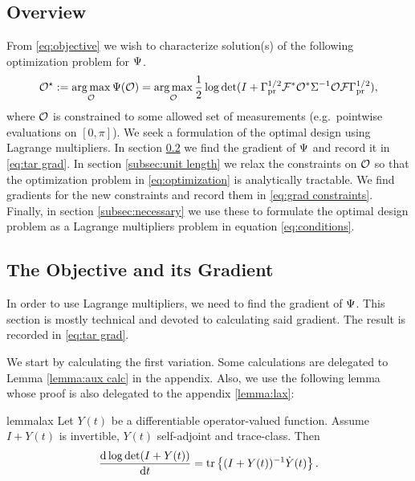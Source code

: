 \documentclass{amsart}
\numberwithin{equation}{section}
\begin{document}
\subsection{Overview}
From \eqref{eq:objective} we wish to characterize solution(s) of the
following optimization problem for $\Psi$. %
\begin{align}\label{eq:optimization}
  \mathcal{O}^{\star} := \operatorname*{arg\,max}_{\mathcal{O}} \Psi( \mathcal{O} ) 
  = \operatorname*{arg\,max}_{\mathcal{O}} \frac12 \log \det 
  (I + \Gamma_{\textup{pr}}^{1/2} \mathcal{F}^*\mathcal{O}^* \Sigma^{-1} \mathcal{O} \mathcal{F} \Gamma_{\textup{pr}}^{1/2}),
\end{align}
where $\mathcal{O}$ is constrained to some allowed set of measurements
(e.g.\ pointwise evaluations on $[0,\pi]$).
We seek a formulation of the optimal design using Lagrange
multipliers. In section \ref{section:objective} we find the gradient
of $\Psi$ and record it in \eqref{eq:tar grad}. In section
\ref{subsec:unit length} we relax the constraints on $\mathcal{O}$ so that
the optimization problem in \eqref{eq:optimization} is analytically
tractable.  We find gradients for the new constraints and record them
in \eqref{eq:grad constraints}. Finally, in section
\ref{subsec:necessary} we use these to formulate the optimal design
problem as a Lagrange multipliers problem in equation
\eqref{eq:conditions}.


\subsection{The Objective and its Gradient}\label{section:objective}
In order to use Lagrange multipliers, we need to find the gradient of
$\Psi$. This section is mostly technical and devoted to calculating
said gradient. The result is recorded in \eqref{eq:tar grad}.

We start by calculating the first variation. Some calculations are
delegated to Lemma \ref{lemma:aux calc} in the appendix. Also, we use
the following lemma whose proof is also delegated to the appendix
\ref{lemma:lax}:
\begin{restatable*}{lemma}{lax}\label{lemma:lax}
  Let $Y(t)$ be a differentiable operator-valued function. Assume 
  $I+Y(t)$ is invertible, $Y(t)$ self-adjoint and trace-class. Then
  \begin{equation*}
    \frac{\text{\textup{d}} \log \det (I+Y(t))}{\text{\textup{d}} t} = \textup{tr}\left \{(I+Y(t))^{-1} \dot{Y}(t) \right \}.
  \end{equation*}
\end{restatable*}
\end{document}
